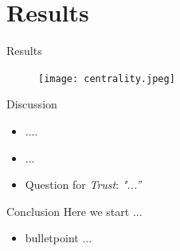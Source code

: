 \documentclass[10pt]{beamer}
\begin{document}
\section{Results}

\begin{frame}{Results}
\begin{figure}
\begin{center}
    \texttt{[image: centrality.jpeg]}
\end{center}
\end{figure}
\end{frame}

\begin{frame}{Discussion}
 \begin{itemize}
    \item ....
    \item ...
    \item Question for \textit{Trust}: \textit{"...”}
 \end{itemize}
\end{frame}

\begin{frame}{Conclusion}
 Here we start ...
 \begin{itemize}
     \item bulletpoint ...
 \end{itemize}
\end{frame}
\end{document}
